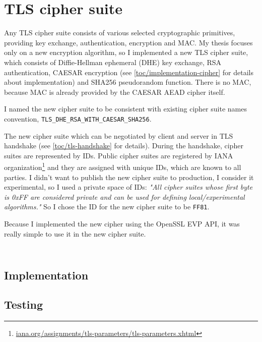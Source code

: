 \inputminted{c}{code/openssl/apps/enc.c}


\section{TLS cipher suite}
\label{toc/implementation-cipher-suite}

Any TLS cipher suite consists of various selected cryptographic primitives, providing key exchange, authentication, encryption and MAC. My thesis focuses only on a new encryption algorithm, so I implemented a new TLS cipher suite, which consists of Diffie-Hellman ephemeral (DHE) key exchange, RSA authentication, CAESAR encryption (see \autoref{toc/implementation-cipher} for details about implementation) and SHA256 pseudorandom function. There is no MAC, because MAC is already provided by the CAESAR AEAD cipher itself.

I named the new cipher suite to be consistent with existing cipher suite names convention, \texttt{TLS\_DHE\_RSA\_WITH\_CAESAR\_SHA256}.

The new cipher suite which can be negotiated by client and server in TLS handshake (see \autoref{toc/tls-handshake} for details). During the handshake, cipher suites are represented by IDs. Public cipher suites are registered by IANA organization\footnote{\url{iana.org/assignments/tls-parameters/tls-parameters.xhtml}} and they are assigned with unique IDs, which are known to all parties. I didn't want to publish the new cipher suite to production, I consider it experimental, so I used a private space of IDs: \textit{"All cipher suites whose first byte is 0xFF are considered private and can be used for defining local/experimental algorithms."} \cite[p.~55]{rfc2246} So I chose the ID for the new cipher suite to be \texttt{FF81}.

Because I implemented the new cipher using the OpenSSL EVP API, it was really simple to use it in the new cipher suite.

\inputminted{c}{code/openssl/ssl/tls1.h}
\inputminted{c}{code/openssl/ssl/s3_lib.c}

\subsection{Implementation}

\subsection{Testing}
